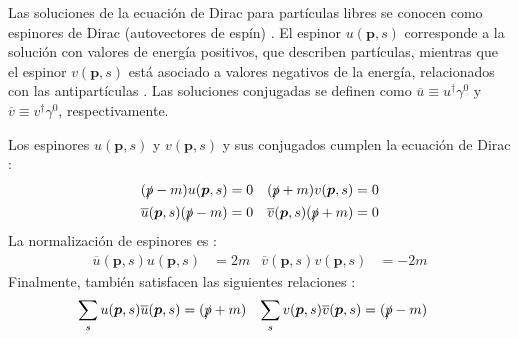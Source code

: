 Las soluciones de la ecuación de Dirac para partículas libres se conocen como espinores de Dirac (autovectores de espín) \cite{MCR}. El espinor $u(\boldsymbol{p},s)$ corresponde a la solución con valores de energía positivos, que describen partículas, mientras que el espinor $v(\boldsymbol{p},s)$ está asociado a valores negativos de la energía, relacionados con las antipartículas \cite{Donelly}. Las soluciones conjugadas se definen como $\overline{u} \equiv u^{\dagger} \gamma^{0}$ y $\overline{v} \equiv v^{\dagger} \gamma^{0}$, respectivamente.

Los espinores $u(\boldsymbol{p},s)$ y $v(\boldsymbol{p},s)$ y sus conjugados cumplen la ecuación de Dirac \cite{Donelly}:
\begin{align*}
(\slashed{p}-m)u(\boldsymbol{p},s) &=0 & (\slashed{p}+m)v(\boldsymbol{p},s) &=0 \\
\overline{u}(\boldsymbol{p},s)(\slashed{p}-m) &=0 & \overline{v}(\boldsymbol{p},s )(\slashed{p}+m)&=0
\end{align*}
La normalización de espinores es \cite{Paschos}:
\begin{align*}
\overline{u}(\boldsymbol{p},s)u(\boldsymbol{p},s) &= 2m & \overline{v}(\boldsymbol{p},s)v(\boldsymbol{p},s) &= -2m
\end{align*}
Finalmente, también satisfacen las siguientes relaciones \cite{Paschos}:
\begin{align*}
\sum_s u(\boldsymbol{p},s)\overline{u}(\boldsymbol{p},s) &= (\slashed{p}+m) & \sum_s v(\boldsymbol{p},s)\overline{v}(\boldsymbol{p},s) &= (\slashed{p}-m)
\end{align*}

